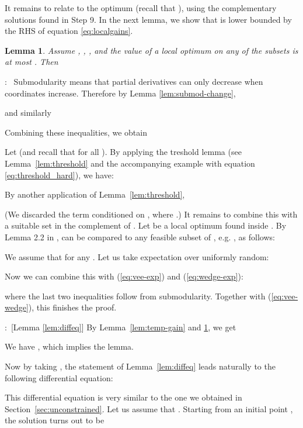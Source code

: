 \documentclass{article}[11pt]
\newtheorem{lemma}[theorem]{Lemma}
\renewenvironment{proof}{\noindent{\bf Proof}:~}{\\}
\begin{document}
It remains to relate  to the optimum (recall that ),
using the complementary solutions found in Step 9.
In the next lemma, we show that  is lower bounded by the RHS of equation
\eqref{eq:localgains}.

\begin{lemma}
\label{lem:OPT-bound}
Assume , ,
, and the value
of a local optimum on any of the subsets  is at most .
Then

\end{lemma}

\begin{proof}
Submodularity means that partial derivatives can only decrease when coordinates
increase. Therefore by Lemma \ref{lem:submod-change},

and similarly

Combining these inequalities, we obtain

Let  (and recall that  for all ). 
By applying the treshold lemma (see Lemma~\ref{lem:threshold} and the accompanying
example with equation \eqref{eq:threshold_hard}), we have:



By another application of Lemma~\ref{lem:threshold},

(We discarded the term conditioned on , where .)
It remains to combine this with a suitable set in the complement of .
Let  be a local optimum found inside .
By Lemma 2.2 in \cite{LMNS09},  can be compared to any feasible subset
of , e.g. , as follows:

We assume that  for any .
Let us take expectation over  uniformly random:

Now we can combine this with (\ref{eq:vee-exp}) and (\ref{eq:wedge-exp}):

where the last two inequalities follow from submodularity. 
Together with (\ref{eq:vee-wedge}), this finishes the proof.
\end{proof}




\begin{proof}[Lemma \ref{lem:diffeq}]
By Lemma~\ref{lem:temp-gain} and \ref{lem:OPT-bound}, we get

We have ,
which implies the lemma.
\end{proof}

Now by taking ,
the statement of Lemma~\ref{lem:diffeq} leads naturally to the following differential equation:

This differential equation is very similar to the one we obtained in 
Section~\ref{sec:unconstrained}. Let us assume that .
Starting from an initial point , the solution turns out to be
\end{document}
